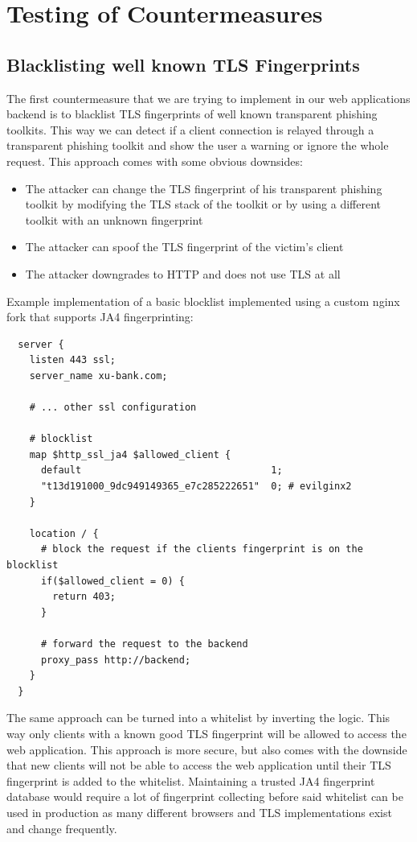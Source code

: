 \documentclass[12pt]{scrbook}
\begin{document}
\newpage \section{Testing of Countermeasures} \subsection{Blacklisting well
known TLS Fingerprints} The first countermeasure that we are trying to implement
in our web applications backend is to blacklist TLS fingerprints of well known
transparent phishing toolkits. This way we can detect if a client connection is
relayed through a transparent phishing toolkit and show the user a warning or
ignore the whole request. This approach comes with some obvious downsides:

\begin{itemize} \item The attacker can change the TLS fingerprint of his
  transparent phishing toolkit by modifying the TLS stack of the toolkit or by
  using a different toolkit with an unknown fingerprint \item The attacker can
  spoof the TLS fingerprint of the victim's client \item The attacker downgrades
to HTTP and does not use TLS at all \end{itemize}

Example implementation of a basic blocklist implemented using a custom nginx
fork that supports JA4 fingerprinting:

\begin{verbatim}
  server {
    listen 443 ssl;
    server_name xu-bank.com;

    # ... other ssl configuration

    # blocklist
    map $http_ssl_ja4 $allowed_client {
      default                                 1;
      "t13d191000_9dc949149365_e7c285222651"  0; # evilginx2
    }

    location / {
      # block the request if the clients fingerprint is on the blocklist
      if($allowed_client = 0) {
        return 403;
      }

      # forward the request to the backend
      proxy_pass http://backend;
    }
  }
\end{verbatim}

The same approach can be turned into a whitelist by inverting the logic. This
way only clients with a known good TLS fingerprint will be allowed to access the
web application. This approach is more secure, but also comes with the downside
that new clients will not be able to access the web application until their TLS
fingerprint is added to the whitelist. Maintaining a trusted JA4 fingerprint
database would require a lot of fingerprint collecting before said whitelist can
be used in production as many different browsers and TLS implementations exist
and change frequently.
\end{document}

